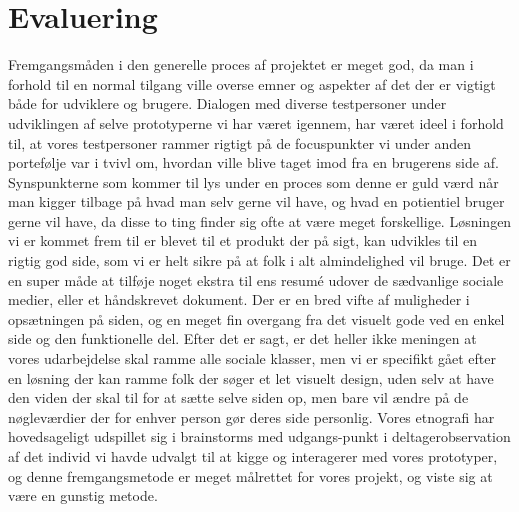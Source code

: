 \documentclass[a4paper,titlepage,fleqn,12pt]{article}
\begin{document}
\section{Evaluering}
Fremgangsmåden i den generelle proces af projektet er meget god, 
da man i forhold til en normal tilgang ville overse emner og aspekter
af det der er vigtigt både for udviklere og brugere. Dialogen med 
diverse testpersoner under udviklingen af selve prototyperne vi har været igennem, har været ideel i forhold til, at vores testpersoner rammer rigtigt på de focuspunkter vi under anden portefølje var i tvivl om, hvordan ville blive taget imod fra en brugerens side af. 
Synspunkterne som kommer til lys under en proces som denne er guld 
værd når man kigger tilbage på hvad man selv gerne vil have, og hvad
en potientiel bruger gerne vil have, da disse to ting finder sig ofte
at være meget forskellige. Løsningen vi er kommet frem til er blevet til et produkt der på sigt, kan udvikles til en rigtig god side, som vi er helt sikre på at folk i alt almindelighed vil bruge. Det er en super måde at tilføje noget ekstra til ens resumé udover de sædvanlige sociale medier, eller et håndskrevet dokument. Der er en bred vifte af muligheder i opsætningen på siden, og en meget fin overgang fra 
det visuelt gode ved en enkel side og den funktionelle del.
Efter det er sagt, er det heller ikke meningen at vores udarbejdelse skal ramme alle sociale klasser, men vi er specifikt gået efter en løsning der kan ramme folk der søger et let visuelt design, uden selv at have den viden der skal til for at sætte selve siden op, men bare vil ændre på de nøgleværdier der for enhver person gør deres side personlig.
Vores etnografi har hovedsageligt udspillet sig i brainstorms med udgangs-punkt i deltagerobservation af det individ vi havde udvalgt til at kigge og interagerer med vores prototyper, og denne fremgangsmetode er meget målrettet for vores projekt, og viste sig at være en gunstig metode.
\end{document}
